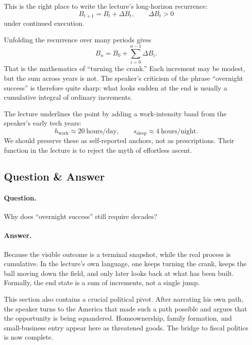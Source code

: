 This is the right place to write the lecture's long-horizon recurrence:
\begin{equation}
B_{t+1}=B_t+\Delta B_t,\qquad \Delta B_t>0
\end{equation}
under continued execution.

Unfolding the recurrence over many periods gives
\begin{equation}
B_n = B_0+\sum_{i=0}^{n-1}\Delta B_i.
\end{equation}
That is the mathematics of ``turning the crank.'' Each increment may be modest, but the sum across years is not. The speaker's criticism of the phrase ``overnight success'' is therefore quite sharp: what looks sudden at the end is usually a cumulative integral of ordinary increments.

The lecture underlines the point by adding a work-intensity band from the speaker's early tech years:
\begin{equation}
h_{\text{work}} \approx 20\ \text{hours/day},\qquad s_{\text{sleep}} \approx 4\ \text{hours/night}.
\end{equation}
We should preserve these as self-reported anchors, not as prescriptions. Their function in the lecture is to reject the myth of effortless ascent.

\subsection{Question \& Answer}

\paragraph{Question.} Why does ``overnight success'' still require decades?

\paragraph{Answer.} Because the visible outcome is a terminal snapshot, while the real process is cumulative. In the lecture's own language, one keeps turning the crank, keeps the ball moving down the field, and only later looks back at what has been built. Formally, the end state is a sum of increments, not a single jump.

This section also contains a crucial political pivot. After narrating his own path, the speaker turns to the America that made such a path possible and argues that the opportunity is being squandered. Homeownership, family formation, and small-business entry appear here as threatened goods. The bridge to fiscal politics is now complete.

